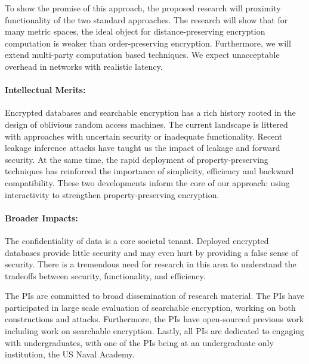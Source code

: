 \documentclass[11pt]{article}
\begin{document}
To show the promise of this approach, the proposed research will proximity functionality of the two standard approaches.  The research will show that for many metric spaces, the ideal object for distance-preserving encryption computation is weaker than order-preserving encryption.  Furthermore, we will extend multi-party computation based techniques.  We expect unacceptable overhead in networks with realistic latency.
\paragraph{Intellectual Merits:}  

Encrypted databases and searchable encryption has a rich history rooted in the design of oblivious random access machines.  The current landscape is littered with approaches with uncertain security or inadequate functionality.  Recent leakage inference attacks have taught us the impact of leakage and forward security.  At the same time, the rapid deployment of property-preserving techniques has reinforced the importance of simplicity, efficiency and backward compatibility.  These two developments inform the core of our approach: using interactivity to strengthen property-preserving encryption.

\paragraph{Broader Impacts:}

The confidentiality of data is a core societal tenant.  Deployed encrypted databases provide little security and may even hurt by providing a false sense of security.  There is a tremendous need for research in this area to understand the tradeoffs between security, functionality, and efficiency.

The PIs are committed to broad dissemination of research material.  The PIs have participated in large scale evaluation of searchable encryption, working on both constructions and attacks.  Furthermore, the PIs have open-sourced previous work including work on searchable encryption.  Lastly, all PIs are dedicated to engaging with undergraduates, with one of the PIs being at an undergraduate only institution, the US Naval Academy.
\end{document}
